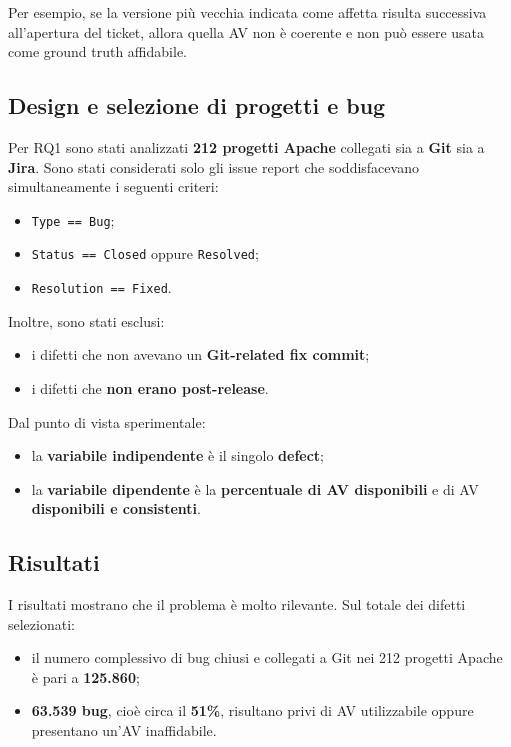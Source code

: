 \begin{notaprof}
Per esempio, se la versione più vecchia indicata come affetta risulta successiva all'apertura del ticket, allora quella AV non è coerente e non può essere usata come ground truth affidabile.
\end{notaprof}

\subsection{Design e selezione di progetti e bug}

Per RQ1 sono stati analizzati \textbf{212 progetti Apache} collegati sia a \textbf{Git} sia a \textbf{Jira}. Sono stati considerati solo gli issue report che soddisfacevano simultaneamente i seguenti criteri:

\begin{itemize}
    \item \texttt{Type == Bug};
    \item \texttt{Status == Closed} oppure \texttt{Resolved};
    \item \texttt{Resolution == Fixed}.
\end{itemize}

Inoltre, sono stati esclusi:

\begin{itemize}
    \item i difetti che non avevano un \textbf{Git-related fix commit};
    \item i difetti che \textbf{non erano post-release}.
\end{itemize}

Dal punto di vista sperimentale:

\begin{itemize}
    \item la \textbf{variabile indipendente} è il singolo \textbf{defect};
    \item la \textbf{variabile dipendente} è la \textbf{percentuale di AV disponibili} e di AV \textbf{disponibili e consistenti}.
\end{itemize}

\subsection{Risultati}

I risultati mostrano che il problema è molto rilevante. Sul totale dei difetti selezionati:

\begin{itemize}
    \item il numero complessivo di bug chiusi e collegati a Git nei 212 progetti Apache è pari a \textbf{125.860};
    \item \textbf{63.539 bug}, cioè circa il \textbf{51\%}, risultano privi di AV utilizzabile oppure presentano un'AV inaffidabile.
\end{itemize}

